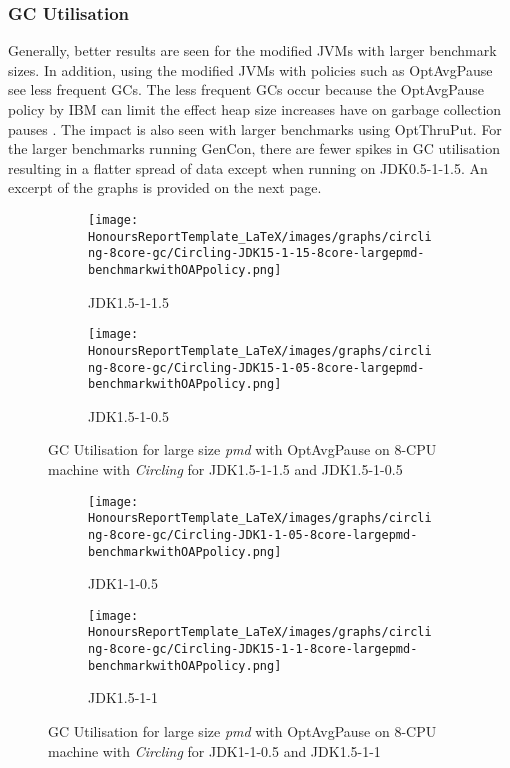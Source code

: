 \subsubsection{GC Utilisation}
Generally, better results are
seen for the modified JVMs with larger benchmark sizes. In addition,
using the modified JVMs with policies such as OptAvgPause see less
frequent GCs. The less frequent GCs occur because the OptAvgPause policy
by IBM can limit the effect heap size increases have on garbage
collection pauses \cite{persson2006gc2}. The impact is also seen with larger
benchmarks using OptThruPut. For the larger benchmarks running
GenCon, there are fewer spikes in GC utilisation resulting in a flatter spread
of data except when running on JDK0.5-1-1.5. An excerpt of the graphs is provided on the next page. 
\newpage
\begin{figure} [H]
\begin{subfigure}{1\textwidth}
\texttt{[image: HonoursReportTemplate\_LaTeX/images/graphs/circling-8core-gc/Circling-JDK15-1-15-8core-largepmd-benchmarkwithOAPpolicy.png]}
\caption{JDK1.5-1-1.5}
\label{fig:circling-gc-01}
\end{subfigure}
\begin{subfigure}{1\textwidth}
\texttt{[image: HonoursReportTemplate\_LaTeX/images/graphs/circling-8core-gc/Circling-JDK15-1-05-8core-largepmd-benchmarkwithOAPpolicy.png]}
\caption{JDK1.5-1-0.5}
\label{fig:circling-gc-02}
\end{subfigure}
\caption{GC Utilisation for large size \emph{pmd} with OptAvgPause on 8-CPU machine with \emph{Circling} for JDK1.5-1-1.5 and JDK1.5-1-0.5}
\end{figure}
\newpage
\begin{figure} [H]
\begin{subfigure}{1\textwidth}
\texttt{[image: HonoursReportTemplate\_LaTeX/images/graphs/circling-8core-gc/Circling-JDK1-1-05-8core-largepmd-benchmarkwithOAPpolicy.png]}
\caption{JDK1-1-0.5}
\label{fig:circling-gc-03}
\end{subfigure}
\begin{subfigure}{1\textwidth}
\texttt{[image: HonoursReportTemplate\_LaTeX/images/graphs/circling-8core-gc/Circling-JDK15-1-1-8core-largepmd-benchmarkwithOAPpolicy.png]}
\caption{JDK1.5-1-1}
\label{fig:circling-gc-10}
\end{subfigure}
\caption{GC Utilisation for large size \emph{pmd} with OptAvgPause on 8-CPU machine with \emph{Circling} for JDK1-1-0.5 and JDK1.5-1-1}
\end{figure}

